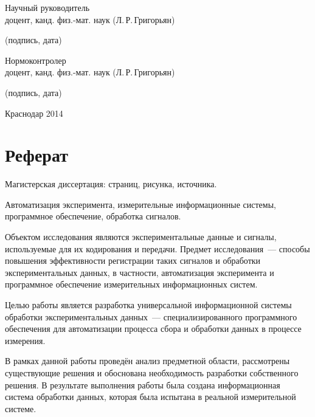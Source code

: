 \documentclass[a4paper, 14pt, titlepage]{extarticle}
\newcommand\sectiontoc[1]{\section*{\centering #1}\addcontentsline{toc}{section}{#1}}
\let\oldsection\section
\renewcommand{\section}{\newpage\oldsection}
\begin{document}
\begin {center}
\begin{flushleft}
    Научный руководитель\\
    доцент, канд. физ.-мат. наук \hrulefill{} (Л.\,Р.\,Григорьян)
    \\[-3mm]{\footnotesize\centering (подпись, дата)\par}

    Нормоконтролер\\
    доцент, канд. физ.-мат. наук \hrulefill{} (Л.\,Р.\,Григорьян)
    \\[-3mm]{\footnotesize\centering (подпись, дата)\par}
  \end{flushleft}

  \vfill

  Краснодар 2014
  \end {center}

  \sectiontoc{Реферат}

  Магистерская диссертация:  страниц, %
   рисунка,  источника.

  Автоматизация эксперимента, измерительные информационные системы, программное обеспечение,
  обработка сигналов.

  Объектом исследования являются экспериментальные данные и сигналы, используемые для их кодирования
  и передачи. Предмет исследования~--- способы повышения эффективности регистрации таких сигналов и
  обработки экспериментальных данных, в частности, автоматизация эксперимента и программное
  обеспечение измерительных информационных систем.

  Целью работы является разработка универсальной информационной системы обработки экспериментальных
  данных~--- специализированного программного обеспечения для автоматизации процесса сбора и
  обработки данных в процессе измерения.

  В рамках данной работы проведён анализ предметной области, рассмотрены существующие решения и
  обоснована необходимость разработки собственного решения. В результате выполнения работы была
  создана информационная система обработки данных, которая была испытана в реальной измерительной
  системе.



    \clearpage
    \tableofcontents
\end{document}
